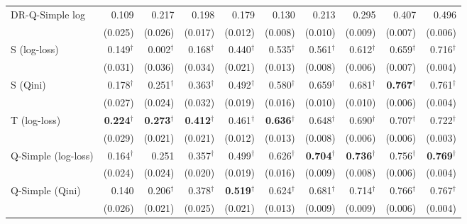\begin{tabular}{l|rrrrrrrrr}
DR-Q-Simple log & 0.109 & 0.217 & 0.198 & 0.179 & 0.130 & 0.213 & 0.295 & 0.407 & 0.496 \\
 & \scriptsize (0.025) & \scriptsize (0.026) & \scriptsize (0.017) & \scriptsize (0.012) & \scriptsize (0.008) & \scriptsize (0.010) & \scriptsize (0.009) & \scriptsize (0.007) & \scriptsize (0.006) \\[2pt]
\hline
S (log-loss) & 0.149$^\dagger$ & 0.002$^\dagger$ & 0.168$^\dagger$ & 0.440$^\dagger$ & 0.535$^\dagger$ & 0.561$^\dagger$ & 0.612$^\dagger$ & 0.659$^\dagger$ & 0.716$^\dagger$ \\
 & \scriptsize (0.031) & \scriptsize (0.036) & \scriptsize (0.034) & \scriptsize (0.021) & \scriptsize (0.013) & \scriptsize (0.008) & \scriptsize (0.006) & \scriptsize (0.007) & \scriptsize (0.004) \\[2pt]
S (Qini) & 0.178$^\dagger$ & 0.251$^\dagger$ & 0.363$^\dagger$ & 0.492$^\dagger$ & 0.580$^\dagger$ & 0.659$^\dagger$ & 0.681$^\dagger$ & \textbf{0.767}$^\dagger$ & 0.761$^\dagger$ \\
 & \scriptsize (0.027) & \scriptsize (0.024) & \scriptsize (0.032) & \scriptsize (0.019) & \scriptsize (0.016) & \scriptsize (0.010) & \scriptsize (0.010) & \scriptsize (0.006) & \scriptsize (0.004) \\[2pt]
T (log-loss) & \textbf{0.224}$^\dagger$ & \textbf{0.273}$^\dagger$ & \textbf{0.412}$^\dagger$ & 0.461$^\dagger$ & \textbf{0.636}$^\dagger$ & 0.648$^\dagger$ & 0.690$^\dagger$ & 0.707$^\dagger$ & 0.722$^\dagger$ \\
 & \scriptsize (0.029) & \scriptsize (0.021) & \scriptsize (0.021) & \scriptsize (0.012) & \scriptsize (0.013) & \scriptsize (0.008) & \scriptsize (0.006) & \scriptsize (0.006) & \scriptsize (0.003) \\[2pt]
Q-Simple (log-loss) & 0.164$^\dagger$ & 0.251 & 0.357$^\dagger$ & 0.499$^\dagger$ & 0.626$^\dagger$ & \textbf{0.704}$^\dagger$ & \textbf{0.736}$^\dagger$ & 0.756$^\dagger$ & \textbf{0.769}$^\dagger$ \\
 & \scriptsize (0.024) & \scriptsize (0.024) & \scriptsize (0.020) & \scriptsize (0.019) & \scriptsize (0.016) & \scriptsize (0.009) & \scriptsize (0.008) & \scriptsize (0.006) & \scriptsize (0.004) \\[2pt]
Q-Simple (Qini) & 0.140 & 0.206$^\dagger$ & 0.378$^\dagger$ & \textbf{0.519}$^\dagger$ & 0.624$^\dagger$ & 0.681$^\dagger$ & 0.714$^\dagger$ & 0.766$^\dagger$ & 0.767$^\dagger$ \\
 & \scriptsize (0.026) & \scriptsize (0.021) & \scriptsize (0.025) & \scriptsize (0.021) & \scriptsize (0.013) & \scriptsize (0.009) & \scriptsize (0.009) & \scriptsize (0.006) & \scriptsize (0.004) \\[2pt]
\hline
\end{tabular}
